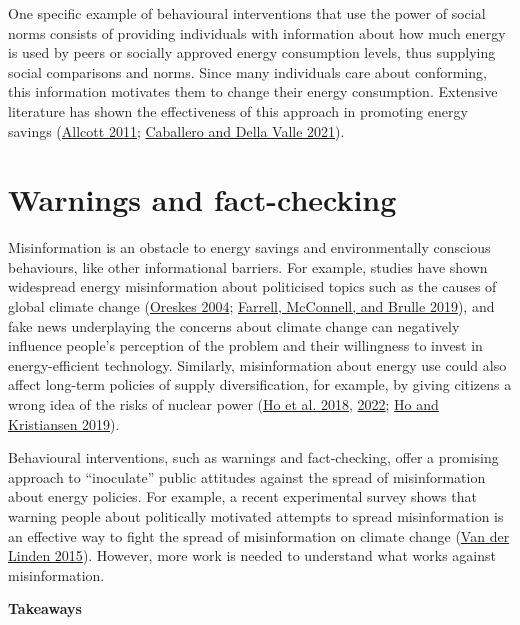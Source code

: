 \documentclass[
  11pt,
  captions=heading]{scrreport}
\begin{document}
One specific example of behavioural interventions that use the power of
social norms consists of providing individuals with information about
how much energy is used by peers or socially approved energy consumption
levels, thus supplying social comparisons and norms. Since many
individuals care about conforming, this information motivates them to
change their energy consumption. Extensive literature has shown the
effectiveness of this approach in promoting energy savings
(\protect\hyperlink{ref-allcott2011social}{Allcott 2011};
\protect\hyperlink{ref-caballero2021tackling}{Caballero and Della Valle
2021}).

\hypertarget{warnings-and-fact-checking}{%
\section{Warnings and fact-checking}\label{warnings-and-fact-checking}}

Misinformation is an obstacle to energy savings and environmentally
conscious behaviours, like other informational barriers. For example,
studies have shown widespread energy misinformation about politicised
topics such as the causes of global climate change
(\protect\hyperlink{ref-oreskes2004scientific}{Oreskes 2004};
\protect\hyperlink{ref-farrell2019evidence}{Farrell, McConnell, and
Brulle 2019}), and fake news underplaying the concerns about climate
change can negatively influence people's perception of the problem and
their willingness to invest in energy-efficient technology. Similarly,
misinformation about energy use could also affect long-term policies of
supply diversification, for example, by giving citizens a wrong idea of
the risks of nuclear power (\protect\hyperlink{ref-ho2018can}{Ho et al.
2018}, \protect\hyperlink{ref-ho2022fake}{2022};
\protect\hyperlink{ref-ho2019environmental}{Ho and Kristiansen 2019}).

Behavioural interventions, such as warnings and fact-checking, offer a
promising approach to ``inoculate'' public attitudes against the spread
of misinformation about energy policies. For example, a recent
experimental survey shows that warning people about politically
motivated attempts to spread misinformation is an effective way to fight
the spread of misinformation on climate change
(\protect\hyperlink{ref-van2015social}{Van der Linden 2015}). However,
more work is needed to understand what works against misinformation.

\textbf{Takeaways}
\end{document}
